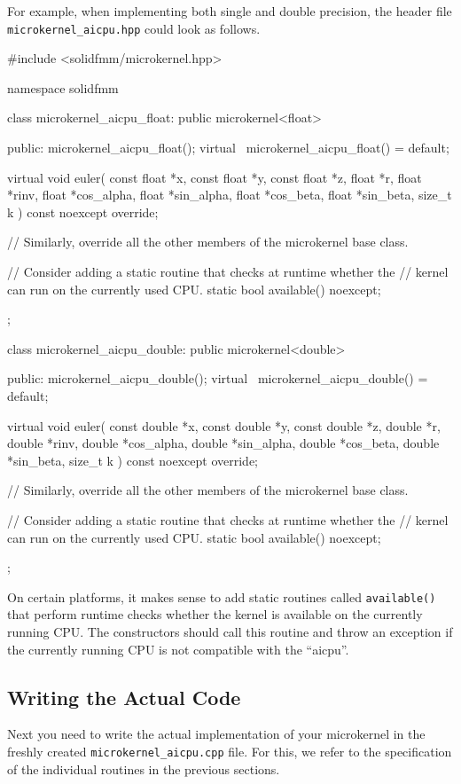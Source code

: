 \documentclass{scrbook}
\begin{document}
For example, when implementing both single and double precision, the header
file \lstinline|microkernel_aicpu.hpp| could look as follows.
\begin{cppcode*}
#include <solidfmm/microkernel.hpp>

namespace solidfmm
{

class microkernel_aicpu_float: public microkernel<float>
{
public:
    microkernel_aicpu_float();
    virtual ~microkernel_aicpu_float() = default;

    virtual void euler( const float *x,   const float *y, const float *z,
                              float *r,         float *rinv,
                              float *cos_alpha, float *sin_alpha,
                              float *cos_beta,  float *sin_beta,
                        size_t k ) const noexcept override;

    // Similarly, override all the other members of the microkernel base class.

    // Consider adding a static routine that checks at runtime whether the
    // kernel can run on the currently used CPU.
    static bool available() noexcept;
};

class microkernel_aicpu_double: public microkernel<double>
{
public:
    microkernel_aicpu_double();
    virtual ~microkernel_aicpu_double() = default;

    virtual void euler( const double *x,   const double *y, const double *z,
                              double *r,         double *rinv,
                              double *cos_alpha, double *sin_alpha,
                              double *cos_beta,  double *sin_beta,
                        size_t k ) const noexcept override;

    // Similarly, override all the other members of the microkernel base class.

    // Consider adding a static routine that checks at runtime whether the
    // kernel can run on the currently used CPU.
    static bool available() noexcept;
};

}
\end{cppcode*}

On certain platforms, it makes sense to add static routines called
\lstinline|available()| that perform runtime checks whether the kernel is
available on the currently running CPU. The constructors should call this
routine and throw an exception if the currently running CPU is not compatible
with the \enquote{aicpu}. 

\subsection{Writing the Actual Code}
Next you need to write the actual implementation of your microkernel in the 
freshly created \lstinline|microkernel_aicpu.cpp| file. For this, we refer to
the specification of the individual routines in the previous sections.
\end{document}
